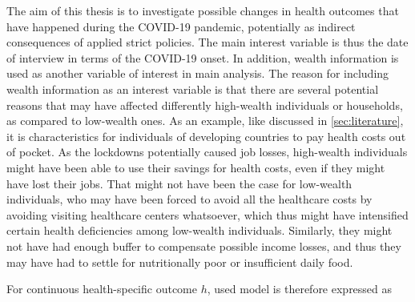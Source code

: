 \documentclass[12pt,a4paper,notitlepage]{article}
\begin{document}
The aim of this thesis is to investigate possible changes in health outcomes that have happened during the COVID-19 pandemic, potentially as indirect consequences of applied strict policies. The main interest variable is thus the date of interview in terms of the COVID-19 onset. In addition, wealth information is used as another variable of interest in main analysis. The reason for including wealth information as an interest variable is that there are several potential reasons that may have affected differently high-wealth individuals or households, as compared to low-wealth ones. As an example, like discussed in \cref{sec:literature}, it is characteristics for individuals of developing countries to pay health costs out of pocket. As the lockdowns potentially caused job losses, high-wealth individuals might have been able to use their savings for health costs, even if they might have lost their jobs. That might not have been the case for low-wealth individuals, who may have been forced to avoid all the healthcare costs by avoiding visiting healthcare centers whatsoever, which thus might have intensified certain health deficiencies among low-wealth individuals. Similarly, they might not have had enough buffer to compensate possible income losses, and thus they may have had to settle for nutritionally poor or insufficient daily food.

For continuous health-specific outcome $h$, used model is therefore expressed as
\end{document}
